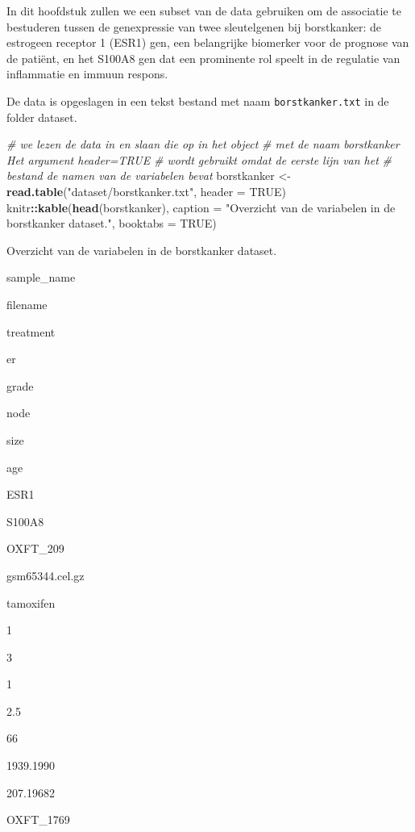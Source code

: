 \documentclass[12pt,dutch,coursenotes]{book}
\newenvironment{Shaded}{\begin{snugshade}}{\end{snugshade}}
\newcommand{\KeywordTok}[1]{\textcolor[rgb]{0.13,0.29,0.53}{\textbf{#1}}}
\newcommand{\DataTypeTok}[1]{\textcolor[rgb]{0.13,0.29,0.53}{#1}}
\newcommand{\StringTok}[1]{\textcolor[rgb]{0.31,0.60,0.02}{#1}}
\newcommand{\CommentTok}[1]{\textcolor[rgb]{0.56,0.35,0.01}{\textit{#1}}}
\newcommand{\OtherTok}[1]{\textcolor[rgb]{0.56,0.35,0.01}{#1}}
\newcommand{\OperatorTok}[1]{\textcolor[rgb]{0.81,0.36,0.00}{\textbf{#1}}}
\newcommand{\NormalTok}[1]{#1}
\theoremstyle{definition}
\theoremstyle{definition}
\theoremstyle{definition}
\theoremstyle{remark}
\begin{document}
In dit hoofdstuk zullen we een subset van de data gebruiken om de
associatie te bestuderen tussen de genexpressie van twee sleutelgenen
bij borstkanker: de estrogeen receptor 1 (ESR1) gen, een belangrijke
biomerker voor de prognose van de patiënt, en het S100A8 gen dat een
prominente rol speelt in de regulatie van inflammatie en immuun respons.

De data is opgeslagen in een tekst bestand met naam
\texttt{borstkanker.txt} in de folder dataset.

\begin{Shaded}
\begin{Highlighting}[]
\CommentTok{# we lezen de data in en slaan die op in het object}
\CommentTok{# met de naam borstkanker Het argument header=TRUE}
\CommentTok{# wordt gebruikt omdat de eerste lijn van het}
\CommentTok{# bestand de namen van de variabelen bevat}
\NormalTok{borstkanker <-}\StringTok{ }\KeywordTok{read.table}\NormalTok{(}\StringTok{"dataset/borstkanker.txt"}\NormalTok{, }
    \DataTypeTok{header =} \OtherTok{TRUE}\NormalTok{)}
\NormalTok{knitr}\OperatorTok{::}\KeywordTok{kable}\NormalTok{(}\KeywordTok{head}\NormalTok{(borstkanker), }\DataTypeTok{caption =} \StringTok{"Overzicht van de variabelen in de borstkanker dataset."}\NormalTok{, }
    \DataTypeTok{booktabs =} \OtherTok{TRUE}\NormalTok{)}
\end{Highlighting}
\end{Shaded}

\label{tab:brcaMicroLin}Overzicht van de variabelen in de borstkanker
dataset.

sample\_name

filename

treatment

er

grade

node

size

age

ESR1

S100A8

OXFT\_209

gsm65344.cel.gz

tamoxifen

1

3

1

2.5

66

1939.1990

207.19682

OXFT\_1769
\end{document}
